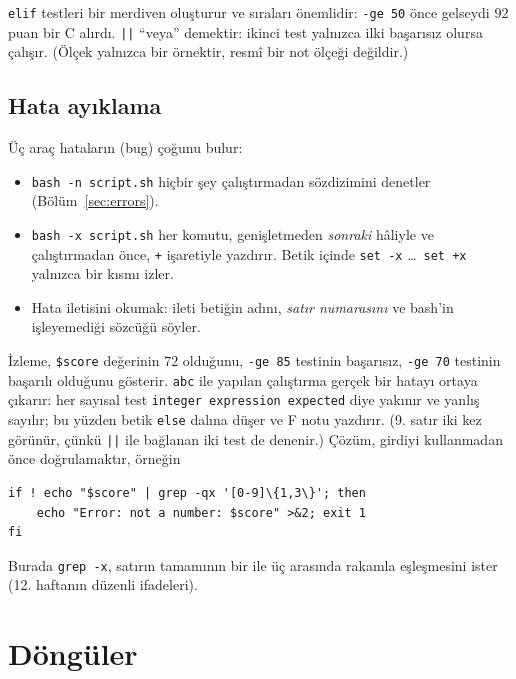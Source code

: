 \documentclass[11pt,a4paper]{article}
\newcommand{\cmd}[1]{\texttt{#1}}
\begin{document}



\texttt{elif} testleri bir merdiven oluşturur ve sıraları önemlidir: \texttt{-ge 50} önce gelseydi $92$ puan bir C alırdı. \texttt{||} “veya” demektir: ikinci test yalnızca ilki başarısız olursa çalışır. (Ölçek yalnızca bir örnektir, resmî bir not ölçeği değildir.)

\subsection{Hata ayıklama}
\label{sec:debug}

Üç araç hataların (bug) çoğunu bulur:
\begin{itemize}
  \item \cmd{bash -n script.sh} hiçbir şey çalıştırmadan sözdizimini denetler (Bölüm~\ref{sec:errors}).
  \item \cmd{bash -x script.sh} her komutu, genişletmeden \emph{sonraki} hâliyle ve çalıştırmadan önce, \texttt{+} işaretiyle yazdırır. Betik içinde \cmd{set -x} \ldots\ \cmd{set +x} yalnızca bir kısmı izler.
  \item Hata iletisini okumak: ileti betiğin adını, \emph{satır numarasını} ve bash'in işleyemediği sözcüğü söyler.
\end{itemize}


İzleme, \texttt{\$score} değerinin $72$ olduğunu, \texttt{-ge 85} testinin başarısız, \texttt{-ge 70} testinin başarılı olduğunu gösterir. \texttt{abc} ile yapılan çalıştırma gerçek bir hatayı ortaya çıkarır: her sayısal test \texttt{integer expression expected} diye yakınır ve yanlış sayılır; bu yüzden betik \texttt{else} dalına düşer ve F notu yazdırır. (9. satır iki kez görünür, çünkü \texttt{||} ile bağlanan iki test de denenir.) Çözüm, girdiyi kullanmadan önce doğrulamaktır, örneğin
\begin{lstlisting}[style=sh,numbers=none]
if ! echo "$score" | grep -qx '[0-9]\{1,3\}'; then
    echo "Error: not a number: $score" >&2; exit 1
fi
\end{lstlisting}
Burada \cmd{grep -x}, satırın tamamının bir ile üç arasında rakamla eşleşmesini ister (12. haftanın düzenli ifadeleri).

\section{Döngüler}
\end{document}
